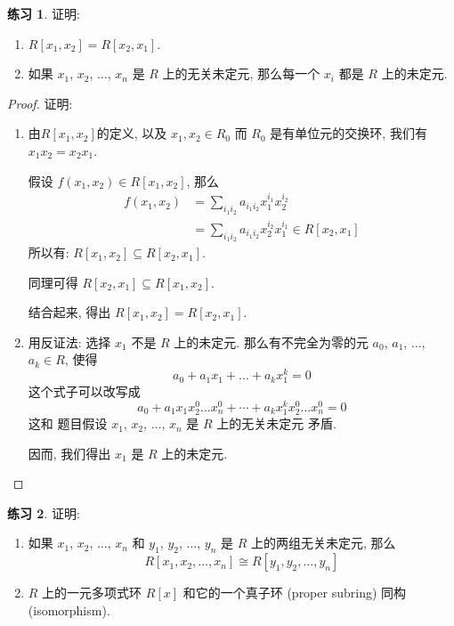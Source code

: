 \documentclass[utf8]{ctexbook}
\theoremstyle{definition}
\newtheorem{exercise}{练习}[section]
\begin{document}
\begin{exercise}
证明:
\begin{enumerate}
\item{$R[x_1, x_2] = R[x_2, x_1]$.}
\item{如果 $x_1$, $x_2$, $\ldots$, $x_n$ 是 $R$ 上的无关未定元, 那么每一个 $x_i$ 都是 $R$ 上的未定元.}
\end{enumerate}
\end{exercise}

\begin{proof}
证明:
\begin{enumerate}
\item{由$R[x_1, x_2]$的定义, 以及 $x_1, x_2 \in R_0$ 而 $R_0$ 是有单位元的交换环, 我们有$x_1 x_2 = x_2 x_1$.

假设 $f(x_1, x_2) \in R[x_1, x_2]$, 那么
\begin{align*}
f(x_1, x_2) &= \sum_{i_1 i_2} a_{i_1 i_2} x_1 ^{i_1} x_2 ^{i_2}  \\
&= \sum_{i_1 i_2} a_{i_1 i_2} x_2 ^{i_2} x_1 ^{i_1} \in R[x_2, x_1] 
\end{align*}
所以有: $R[x_1, x_2] \subseteq R[x_2, x_1]$. 

同理可得 $R[x_2, x_1] \subseteq R[x_1, x_2]$.

结合起来, 得出 $R[x_1, x_2] = R[x_2, x_1]$.
}
\item{用反证法: 选择 $x_1$ 不是 $R$ 上的未定元. 那么有不完全为零的元 $a_0$, $a_1$, $\ldots$, $a_k \in R$, 使得
\begin{equation}
a_0 + a_1 x_1 + \ldots + a_k x_1 ^k = 0
\end{equation}
这个式子可以改写成
\begin{equation}
a_0 + a_1 x_1 x_2 ^0 \ldots x_n ^0 + \cdots + a_k x_1 ^k x_2 ^0 \ldots x_n ^0 = 0
\end{equation}
这和 题目假设 $x_1$, $x_2$, $\ldots$, $x_n$ 是 $R$ 上的无关未定元 矛盾.

因而, 我们得出 $x_1$ 是 $R$ 上的未定元.
}
\end{enumerate}
\end{proof}

\begin{exercise}
证明:
\begin{enumerate}
\item{如果 $x_1$, $x_2$, $\ldots$, $x_n$ 和 $y_1$, $y_2$, $\ldots$, $y_n$ 是 $R$ 上的两组无关未定元, 那么
\begin{equation}
R[x_1, x_2, \ldots, x_n] \cong R[y_1, y_2, \ldots, y_n]
\end{equation}
}
\item{$R$ 上的一元多项式环 $R[x]$ 和它的一个真子环 (proper subring) 同构 (isomorphism).}
\end{enumerate}
\end{exercise}
\end{document}

